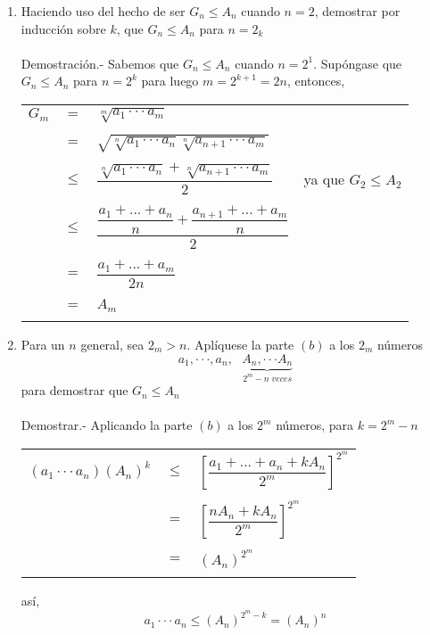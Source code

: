 \begin{enumerate}[\bfseries 1.]
\begin{enumerate}[\bfseries (a)]
             \item Haciendo uso del hecho de ser $G_n \leq A_n$ cuando $n=2$, demostrar por inducción sobre $k$, que $G_n \leq A_n$ para $n=2_k$\\\\
		 Demostración.- \; Sabemos que $G_n \leq A_n$ cuando $n=2^1$. Supóngase que $G_n \leq A_n$ para $n=2^k$ para luego $m=2^{k+1}=2n$, entonces,
		  \begin{center}
		      \begin{tabular}{rcll}
			  $G_m$&$=$&$\sqrt[m]{a_1 \cdot \cdot \cdot a_m}$&\\\\
			  &$=$&$\sqrt{\sqrt[n]{a_1 \cdot \cdot \cdot a_n} \sqrt[n]{a_{n+1}\cdot \cdot \cdot a_m}}$&\\\\
			  &$\leq$&$\dfrac{\sqrt[n]{a_1 \cdot \cdot \cdot a_n} + \sqrt[n]{a_{n+1}\cdot \cdot \cdot a_m}}{2}$& ya que $G_2 \leq A_2$\\\\
			  &$\leq$&$\dfrac{\dfrac{a_1 + ... + a_n}{n} + \dfrac{a_{n+1} + ... + a_m}{n}}{2}$&\\\\
			  &$=$&$\dfrac{a_1 + ... + a_m}{2n}$&\\\\
			  &$=$&$A_m$&\\\\
		      \end{tabular}
		  \end{center}

             \item Para un $n$ general, sea $2_m>n.$ Aplíquese la parte $(b)$ a los $2_m$ números 
                $$a_1,\cdot \cdot \cdot , a_n,\,\,\,\, \underbrace{A_n,\cdot \cdot \cdot A_n}_{{2^{m}-n \;veces}}$$
                para demostrar que $G_n \leq A_n$\\\\
		  Demostrar.- \; Aplicando la parte $(b)$  a los $2^m$ números, para $k=2^m-n$
		  \begin{center}
		      \begin{tabular}{rcl}
			  $(a_1 \cdot \cdot \cdot a_n)(A_n)^k$&$\leq$&$\left[\dfrac{a_1 + ... + a_n + k A_n}{2^m}\right]^{2^m}$\\\\
			  &$=$&$\left[\dfrac{n A_n + k A_n}{2^m}\right]^{2^m}$\\\\
			  &$=$&$(A_n)^{2^m}$\\\\
		      \end{tabular}
		  \end{center}
		  así,
		  $$a_1\cdot \cdot \cdot a_n \leq (A_n)^{2^m - k} = (A_n)^n$$\\\\
          \end{enumerate}


\end{enumerate}

